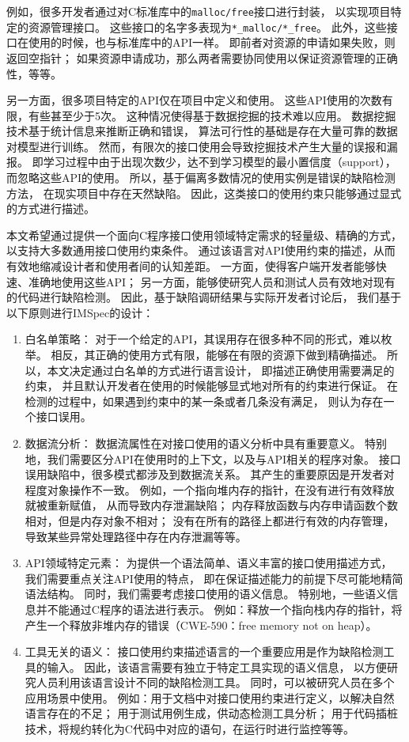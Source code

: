 例如，很多开发者通过对C标准库中的\texttt{malloc/free}接口进行封装，
以实现项目特定的资源管理接口。
这些接口的名字多表现为\texttt{*\_malloc/*\_free}。
此外，这些接口在使用的时候，也与标准库中的API一样。
即前者对资源的申请如果失败，则返回空指针；
如果资源申请成功，那么两者需要协同使用以保证资源管理的正确性，等等。

另一方面，很多项目特定的API仅在项目中定义和使用。
这些API使用的次数有限，有些甚至少于5次。
这种情况使得基于数据挖掘的技术难以应用。
数据挖掘技术基于统计信息来推断正确和错误，
算法可行性的基础是存在大量可靠的数据对模型进行训练。
然而，有限次的接口使用会导致挖掘技术产生大量的误报和漏报。
即学习过程中由于出现次数少，达不到学习模型的最小置信度（support），
而忽略这些API的使用。
所以，基于偏离多数情况的使用实例是错误的缺陷检测方法，
在现实项目中存在天然缺陷。
因此，这类接口的使用约束只能够通过显式的方式进行描述。


本文希望通过提供一个面向C程序接口使用领域特定需求的轻量级、精确的方式，
以支持大多数通用接口使用约束条件。
通过该语言对API使用约束的描述，从而有效地缩减设计者和使用者间的认知差距。
一方面，使得客户端开发者能够快速、准确地使用这些API；
另一方面，能够使研究人员和测试人员有效地对现有的代码进行缺陷检测。
因此，基于缺陷调研结果与实际开发者讨论后，
我们基于以下原则进行IMSpec的设计：
\begin{enumerate}
	\item 白名单策略：
	对于一个给定的API，其误用存在很多种不同的形式，难以枚举。
	相反，其正确的使用方式有限，能够在有限的资源下做到精确描述。
	所以，本文决定通过白名单的方式进行语言设计，
	即描述正确使用需要满足的约束，
	并且默认开发者在使用的时候能够显式地对所有的约束进行保证。
	在检测的过程中，如果遇到约束中的某一条或者几条没有满足，
	则认为存在一个接口误用。
	
	\item 数据流分析：
	数据流属性在对接口使用的语义分析中具有重要意义。
	特别地，我们需要区分API在使用时的上下文，以及与API相关的程序对象。
	接口误用缺陷中，很多模式都涉及到数据流关系。
	其产生的重要原因是开发者对程度对象操作不一致。
	例如，一个指向堆内存的指针，在没有进行有效释放就被重新赋值，
	从而导致内存泄漏缺陷；
	内存释放函数与内存申请函数个数相对，但是内存对象不相对；
	没有在所有的路径上都进行有效的内存管理，导致某些异常处理路径中存在内存泄漏等等。
	
	\item API领域特定元素：
	为提供一个语法简单、语义丰富的接口使用描述方式，
	我们需要重点关注API使用的特点，
	即在保证描述能力的前提下尽可能地精简语法结构。
	同时，我们需要考虑接口使用的语义信息。
	特别地，一些语义信息并不能通过C程序的语法进行表示。
	例如：释放一个指向栈内存的指针，将产生一个释放非堆内存的错误（CWE-590：free memory not on heap）。
	
	\item 工具无关的语义：
	接口使用约束描述语言的一个重要应用是作为缺陷检测工具的输入。
	因此，该语言需要有独立于特定工具实现的语义信息，
	以方便研究人员利用该语言设计不同的缺陷检测工具。
	同时，可以被研究人员在多个应用场景中使用。
	例如：用于文档中对接口使用约束进行定义，以解决自然语言存在的不足；
	用于测试用例生成，供动态检测工具分析；
	用于代码插桩技术，将规约转化为C代码中对应的语句，在运行时进行监控等等。
\end{enumerate}

